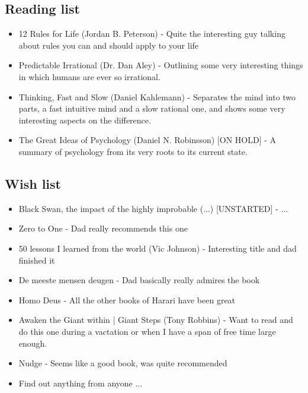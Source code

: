 \documentclass[12pt,a4paper]{article}
\begin{document}
\subsection{Reading list}
\begin{itemize}
\item 12 Rules for Life (Jordan B. Peterson) - Quite the interesting guy talking about rules you can and should apply to your life
\item Predictable Irrational (Dr. Dan Aley) - Outlining some very interesting things in which humans are ever so irrational.
\item Thinking, Fast and Slow (Daniel Kahlemann) - Separates the mind into two parts, a fast intuitive mind and a slow rational one, and shows some very interesting aspects on the difference.
\item The Great Ideas of Psychology (Daniel N. Robinsson) [ON HOLD] - A summary of psychology from its very roots to its current state.
\end{itemize}
\subsection{Wish list}
\begin{itemize}

\item Black Swan, the impact of the highly improbable (...) [UNSTARTED] - ...
\item Zero to One - Dad really recommends this one
\item 50 lessons I learned from the world (Vic Johnson) - Interesting title and dad finished it
\item De meeste mensen deugen - Dad basically really admires the book
\item Homo Deus - All the other books of Harari have been great
\item Awaken the Giant within | Giant Steps (Tony Robbins) - Want to read and do this one during a vactation or when I have a span of free time large enough.
\item Nudge - Seems like a good book, was quite recommended
\item Find out anything from anyone ...

\end{itemize}
\end{document}
